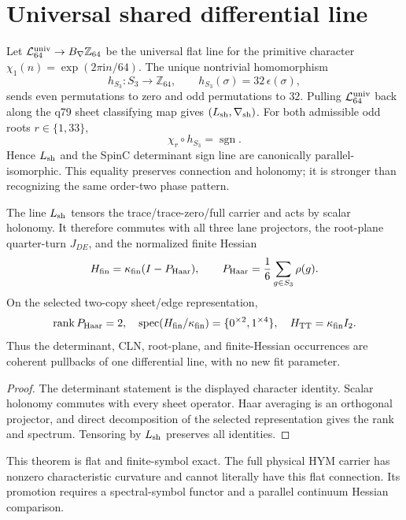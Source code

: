 \documentclass[11pt]{article}
\begin{document}
\section{Universal shared differential line}

Let $\mathcal L_{64}^{\rm univ}\to B_\nabla\mathbb Z_{64}$ be the universal
flat line for the primitive character
$\chi_1(n)=\exp(2\pi\mathrm i n/64)$. The unique nontrivial homomorphism
\[
 h_{S_3}:S_3\longrightarrow\mathbb Z_{64},
 \qquad h_{S_3}(\sigma)=32\,\epsilon(\sigma),
\]
sends even permutations to zero and odd permutations to $32$. Pulling
$\mathcal L_{64}^{\rm univ}$ back along the q79 sheet classifying map gives
$(L_{\rm sh},\nabla_{\rm sh})$. For both admissible odd roots
$r\in\{1,33\}$,
\[
 \chi_r\circ h_{S_3}=\operatorname{sgn}.
\]
Hence $L_{\rm sh}$ and the SpinC determinant sign line are canonically
parallel-isomorphic. This equality preserves connection and holonomy; it is
stronger than recognizing the same order-two phase pattern.

\begin{theorem}
The line $L_{\rm sh}$ tensors the trace/trace-zero/full carrier and acts by
scalar holonomy. It therefore commutes with all three lane projectors, the
root-plane quarter-turn $J_{DE}$, and the normalized finite Hessian
\[
 H_{\rm fin}=\kappa_{\rm fin}(I-P_{\rm Haar}),
 \qquad P_{\rm Haar}=\frac1{6}\sum_{g\in S_3}\rho(g).
\]
On the selected two-copy sheet/edge representation,
\[
 \operatorname{rank}P_{\rm Haar}=2,
 \quad
 \operatorname{spec}(H_{\rm fin}/\kappa_{\rm fin})
 =\{0^{\times2},1^{\times4}\},
 \quad H_{\rm TT}=\kappa_{\rm fin}I_2.
\]
Thus the determinant, CLN, root-plane, and finite-Hessian occurrences are
coherent pullbacks of one differential line, with no new fit parameter.
\end{theorem}

\begin{proof}
The determinant statement is the displayed character identity. Scalar
holonomy commutes with every sheet operator. Haar averaging is an orthogonal
projector, and direct decomposition of the selected representation gives the
rank and spectrum. Tensoring by $L_{\rm sh}$ preserves all identities.
\end{proof}

This theorem is flat and finite-symbol exact. The full physical HYM carrier
has nonzero characteristic curvature and cannot literally have this flat
connection. Its promotion requires a spectral-symbol functor and a parallel
continuum Hessian comparison.
\end{document}
